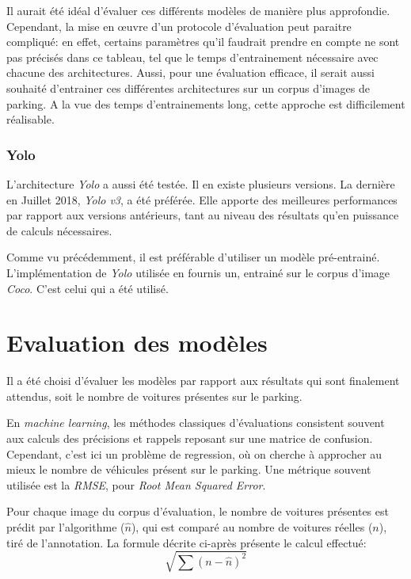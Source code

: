 Il aurait été idéal d'évaluer ces différents modèles de manière plus approfondie. Cependant, la mise en œuvre d'un protocole d'évaluation peut paraitre compliqué: en effet, certains paramètres qu'il faudrait prendre en compte ne sont pas précisés dans ce tableau, tel que le temps d'entrainement nécessaire avec chacune des architectures. Aussi, pour une évaluation efficace, il serait aussi souhaité d'entrainer ces différentes architectures sur un corpus d'images de parking. A la vue des temps d'entrainements long, cette approche est difficilement réalisable. 

\subsubsection{Yolo}

L'architecture \textit{Yolo} a aussi été testée. Il en existe plusieurs versions. La dernière en Juillet 2018, \textit{Yolo v3}, a été préférée. Elle apporte des meilleures performances par rapport aux versions antérieurs, tant au niveau des résultats qu'en puissance de calculs nécessaires\autocite{yolov3}.

Comme vu précédemment, il est préférable d'utiliser un modèle pré-entrainé. L'implémentation de \textit{Yolo} utilisée en fournis un, entrainé sur le corpus d'image \textit{Coco}\autocite{lib:yolo}. C'est celui qui a été utilisé. 

\section{Evaluation des modèles} \label{conception.eval}
Il a été choisi d'évaluer les modèles par rapport aux résultats qui sont finalement attendus, soit le nombre de voitures présentes sur le parking.

En \textit{machine learning}, les méthodes classiques d'évaluations consistent souvent aux calculs des précisions et rappels reposant sur une matrice de confusion. Cependant, c'est ici un problème de regression, où on cherche à approcher au mieux le nombre de véhicules présent sur le parking. Une métrique souvent utilisée est la \textit{RMSE}, pour \textit{Root Mean Squared Error}. \autocite{wiki:rmse}

Pour chaque image du corpus d'évaluation, le nombre de voitures présentes est prédit par l'algorithme ($\hat{n}$), qui est comparé au nombre de voitures réelles ($n$), tiré de l'annotation. La formule décrite ci-après présente le calcul effectué:
\[
    \sqrt{\sum (n - \hat{n})^2 }    
\]
